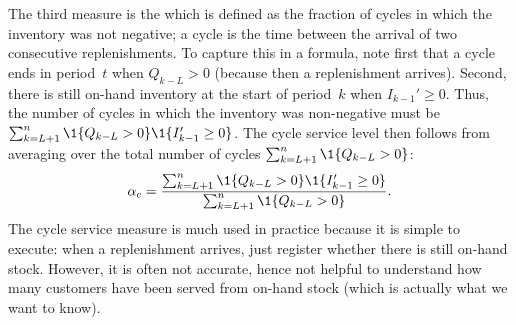 \documentclass[stochastic-or.tex]{subfiles}
\begin{document}
The third measure is the  which is defined as the fraction of cycles in which the inventory was not negative; a cycle is the time between the arrival of two consecutive replenishments.
To capture this in a formula, note first that a cycle ends in period~$t$ when $Q_{k-L}> 0$ (because then a replenishment arrives).
Second, there is still on-hand inventory at the start of period~$k$ when $I_{k-1}'\geq 0$.
Thus, the number of cycles in which the inventory was non-negative must be $\sum_{k=L+1}^n \1{Q_{k-L}>0}\1{I_{k-1}'\geq 0}$.
The cycle service level then follows from averaging over the total number of cycles $\sum_{k=L+1}^n \1{Q_{k-L}>0}$:
\begin{equation*}
\alpha_c =  \frac{\sum_{k=L+1}^n \1{Q_{k-L}>0}\1{I_{k-1}'\geq 0}}{\sum_{k=L+1}^n \1{Q_{k-L}>0}}.
\end{equation*}
The cycle service measure is much used in practice because it is simple to execute: when a replenishment arrives, just register whether there is still on-hand stock.
However, it is often not accurate, hence not  helpful to understand how many customers have been served from on-hand stock (which is actually what we want to know).
\end{document}
